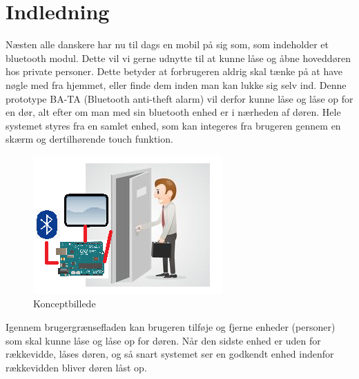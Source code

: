 \graphicspath{{Chapters/Indledning/}}

\section{Indledning}
Næsten alle danskere har nu til dags en mobil på sig som, som indeholder et bluetooth modul. Dette vil vi gerne udnytte til at kunne låse og åbne hoveddøren hos private personer. Dette betyder at forbrugeren aldrig skal tænke på at have nøgle med fra hjemmet, eller finde dem inden man kan lukke sig selv ind. 
Denne prototype BA-TA (Bluetooth anti-theft alarm) vil derfor kunne låse og låse op for en dør, alt efter om man med sin bluetooth enhed er i nærheden af døren. Hele systemet styres fra en samlet enhed, som kan integeres fra brugeren gennem en skærm og dertilhørende touch funktion. 

\begin{figure}[H]
	\centering
	\includegraphics[width = 300 pt]{Img/Konceptbillede.png}
	\caption{Konceptbillede}
	\label{fig:Konceptbillede}
\end{figure}

Igennem brugergrænsefladen kan brugeren tilføje og fjerne enheder (personer) som skal kunne låse og låse op for døren. Når den sidste enhed er uden for rækkevidde, låses døren, og så snart systemet ser en godkendt enhed indenfor rækkevidden bliver døren låst op. 

